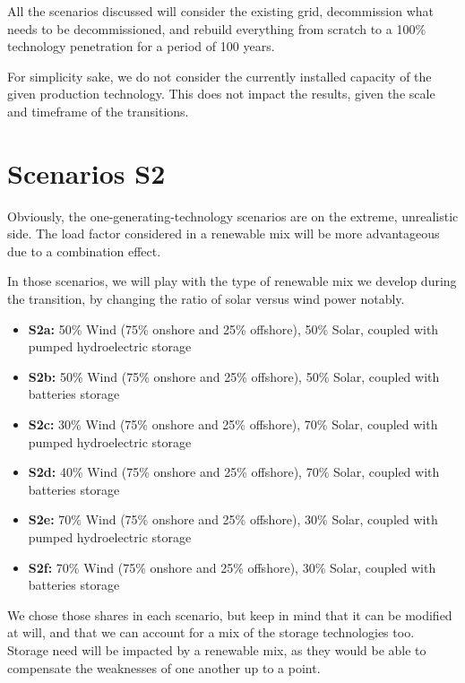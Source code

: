 All the scenarios discussed will consider the existing grid, decommission what needs to be decommissioned, and rebuild everything from scratch to a 100\% technology penetration for a period of 100 years.

For simplicity sake, we do not consider the currently installed capacity of the given production technology. This does not impact the results, given the scale and timeframe of the transitions.


\section{Scenarios S2}

Obviously, the one-generating-technology scenarios are on the extreme, unrealistic side. The load factor considered in a renewable mix will be more advantageous due to a combination effect.

In those scenarios, we will play with the type of renewable mix we develop during the transition, by changing the ratio of solar versus wind power notably.


\begin{kaobox}[frametitle=S2 scenarios]
\begin{itemize}
	\item \textbf{S2a:} 50\% Wind (75\% onshore and 25\% offshore), 50\% Solar, coupled with pumped hydroelectric storage
	\item \textbf{S2b:} 50\% Wind (75\% onshore and 25\% offshore), 50\% Solar, coupled with batteries storage
	\item \textbf{S2c:} 30\% Wind (75\% onshore and 25\% offshore), 70\% Solar, coupled with pumped hydroelectric storage
	\item \textbf{S2d:} 40\% Wind (75\% onshore and 25\% offshore), 70\% Solar, coupled with batteries storage
	\item \textbf{S2e:} 70\% Wind (75\% onshore and 25\% offshore), 30\% Solar, coupled with pumped hydroelectric storage
	\item \textbf{S2f:} 70\% Wind (75\% onshore and 25\% offshore), 30\% Solar, coupled with batteries storage
\end{itemize}
\end{kaobox}

We chose those shares in each scenario, but keep in mind that it can be modified at will, and that we can account for a mix of the storage technologies too. Storage need will be impacted by a renewable mix, as they would be able to compensate the weaknesses of one another up to a point.


